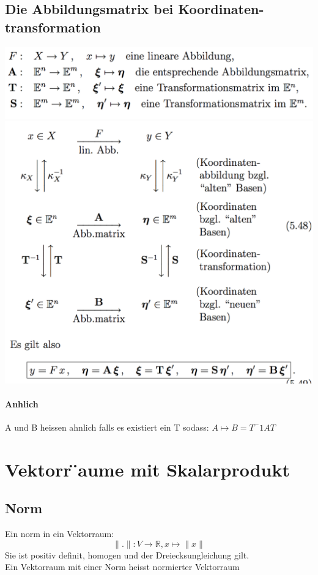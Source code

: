 \documentclass[11pt]{article}
\newcommand\back[1][-3cm]{\hspace*{#1}}
\begin{document}
\subsection{Die Abbildungsmatrix bei Koordinaten- transformation}
\back\includegraphics{images/1}\\
\back\includegraphics{images/2}\\
\paragraph{Anhlich}
A und B heissen ahnlich falls es existiert ein T sodass: $A \mapsto B = T^-1AT$
\section{Vektorr ̈aume mit Skalarprodukt}
\subsection{Norm}
Ein norm in ein Vektorraum:
\begin{equation}
	\parallel.\parallel: V \rightarrow\mathbb{R}, x \mapsto\parallel x\parallel
\end{equation}
Sie ist positiv definit, homogen und der Dreiecksungleichung gilt.\\
Ein Vektorraum mit einer Norm heisst normierter Vektorraum
\end{document}
